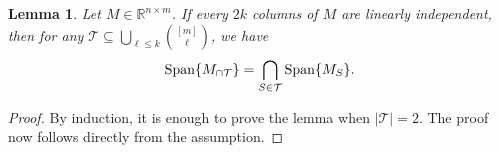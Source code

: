 \documentclass[journal, twocolumn]{IEEEtran}
\newtheorem{lemma}{Lemma}
\begin{document}
\begin{lemma}\label{SpanIntersectionLemma}
Let $M \in \mathbb{R}^{n \times m}$. If every $2k$ columns of $M$ are linearly independent, then for any $\mathcal{T} \subseteq \bigcup_{\ell \leq k} {[m] \choose \ell}$, we have
\begin{align}
\text{\rm Span}\{M_{\cap \mathcal{T}}\}  = \bigcap_{S \in \mathcal{T}} \text{\rm Span}\{M_S\}.
\end{align}
\end{lemma}

\begin{proof}By induction, it is enough to prove the lemma when $|\mathcal{T}| = 2$. The proof now follows directly from the assumption.
\end{proof}


\end{document}
